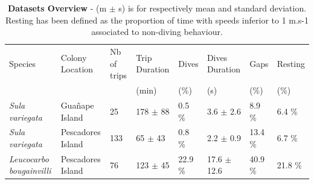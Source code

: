 \documentclass{article}
\begin{document}
\begin{table}[h]
 \caption{\textbf{Datasets Overview} - (m $\pm$ s) is for respectively mean and standard deviation. Resting has been defined as the proportion of time with speeds inferior to 1 m.s-1 associated to non-diving behaviour.}
  \centering
  \begin{tabular}{llllllll}
    \toprule
    Species  &  Colony Location & Nb of trips  & Trip Duration & Dives  & Dives Duration & Gaps & Resting \\
      &    &     & (min) & (\%) & (s) & (\%) & (\%) \\
    \midrule
    \textit{Sula variegata}         & Gua\~nape  Island    & 25   & 178 $\pm$ 88  & 0.5 \%  & 3.6 $\pm$ 2.6 & 8.9 \% & 6.4 \%\\
    \textit{Sula variegata}         & Pescadores Island & 133 & 65 $\pm$ 43  & 0.8 \%  & 2.2 $\pm$ 0.9  & 13.4 \% & 6.7 \%\\
    \textit{Leucocarbo bougainvilli}& Pescadores Island & 76   & 123 $\pm$ 45  & 22.9 \%  & 17.6 $\pm$ 12.6 & 40.9 \% & 21.8 \%\\
    \bottomrule
  \end{tabular}
  \label{table1}
\end{table}
\end{document}
